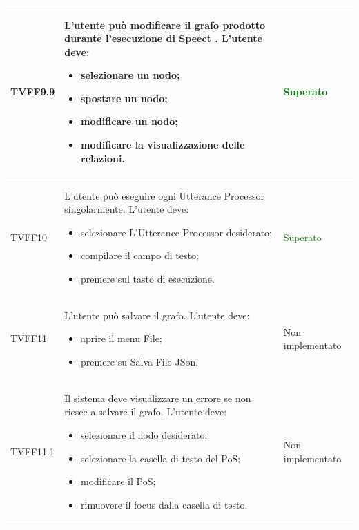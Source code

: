 \documentclass[openany,12pt,a4paper]{report}
\begin{document}
\begin{longtable}[c]{| p{2.5cm} |p{8cm} | p{2.5cm} |}
	\newline TVFF9.9&
	\newline L'utente può modificare il grafo prodotto durante l'esecuzione di Speect . L'utente deve:
	\begin{itemize}
		\item{} selezionare un nodo;
		\item{} spostare un nodo;
		\item{} modificare un nodo;
		\item{} modificare la visualizzazione delle relazioni.
	\end{itemize}&
	\newline \textcolor{green}{Superato}
	\\[1em]
	\hline
	
	\newline TVFF10&
	\newline L'utente può eseguire ogni Utterance Processor singolarmente. L'utente deve:
	\begin{itemize}
		\item selezionare L'Utterance Processor desiderato;
		\item compilare il campo di testo;
		\item premere sul tasto di esecuzione.
	\end{itemize}&
	\newline \textcolor{green}{Superato}
	\\[1em]
	\hline
	
	\newline TVFF11&
	\newline L'utente può salvare il grafo. L'utente deve:
	\begin{itemize}
		\item aprire il menu File;
		\item premere su Salva File JSon.
	\end{itemize}&
	\newline Non implementato
	\\[1em]
	\hline	
	
	\newline TVFF11.1&
	\newline Il sistema deve visualizzare un errore se non riesce a salvare il grafo. L'utente deve:
	\begin{itemize}
		\item selezionare il nodo desiderato;
		\item selezionare la casella di testo del PoS;
		\item modificare il PoS;
		\item rimuovere il focus dalla casella di testo.
	\end{itemize}&
	\newline Non implementato 
	\\[1em]
	\hline
	

\end{longtable}
\end{document}
